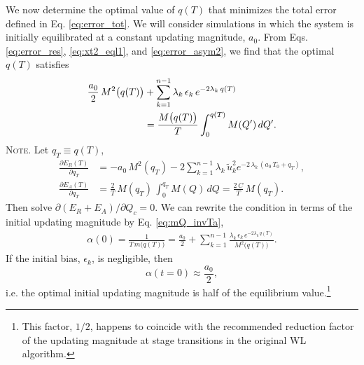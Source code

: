 \documentclass[reprint, superscriptaddress, floatfix]{revtex4-1}
\newcommand{\note}[1]{{\color{DarkGreen}\footnotesize \textsc{Note.} #1}}
\newcommand{\Err}{E}
\begin{document}
We now determine the optimal value of $q(T)$
that minimizes the total error defined in Eq. \eqref{eq:error_tot}.
%
We will consider simulations in which
the system is initially equilibrated at a
constant updating magnitude, $a_0$.
%
From Eqs. \eqref{eq:error_res}, \eqref{eq:xt2_eql1},
and \eqref{eq:error_asym2},
we find that
the optimal $q(T)$ satisfies
%
\begin{align}
  \frac{a_0}{2} \, M^2\bigl( q(T) \bigr)
  &+
  \sum_{k = 1}^{n-1}
  \lambda_k \, \epsilon_k \, e^{-2\lambda_k \, q(T)}
  \notag \\
  &= \frac{ M\bigl( q(T) \bigr) } { T } \int_0^{q(T)} M(Q') \, dQ'
  .
\label{eq:opt_qT}
\end{align}
%
%
\note{Let $q_T \equiv q(T)$,
$$
\begin{aligned}
  \frac{
    \partial \Err_R(T)
  }
  {
    \partial q_T
  }
  &=
  -a_0 \, M^2(q_T)
  -2
  \sum_{k=1}^{n-1} \lambda_k \,
  \tilde u_k^2 e^{-2 \, \lambda_k \, (a_0 \, T_0 + q_T)}
  ,
  \\
  \frac{
    \partial \Err_A(T)
  }
  {
    \partial q_T
  }
  &=
  \frac 2 T \,
  M(q_T) \,
  \int_0^{ q_T } M(Q) \, dQ
  =
  \frac{ 2 \, C } { T } \, M(q_T)
  .
\end{aligned}
$$
Then solve $\partial (\Err_R + \Err_A) / \partial Q_c = 0$.
}
%
We can rewrite the condition in terms of
the initial updating magnitude by Eq. \eqref{eq:mQ_invTa},
\begin{align}
  \alpha(0)
  =
  \frac{1}{T \, m\bigl( q(T) \bigr) }
  =
  \frac{ a_0 } { 2 }
  +
  \sum_{k = 1}^{n-1}
  \frac{
    \lambda_k \, \epsilon_k \, e^{-2\lambda_k \, q(T)}
  }{M^2\bigl( q(T) \bigr)}
  .
  \label{eq:opt_alpha0}
\end{align}
%
If the initial bias, $\epsilon_k$, is negligible, then
%
\begin{equation}
  \alpha( t = 0 )
  \approx
  \frac{ a_0 }
       { 2 }
  ,
\label{eq:half_alpha0}
\end{equation}
%
i.e. the optimal initial updating magnitude
is half of the equilibrium value.\footnote{This factor, $1/2$,
happens to coincide with the
recommended reduction factor of the updating magnitude
at stage transitions
in the original WL algorithm\cite{
wang2001, *wang2001pre}.
}
\end{document}
